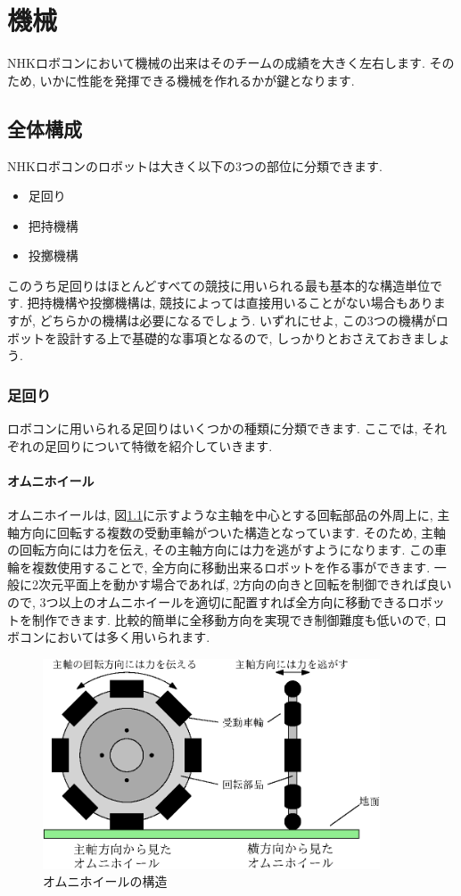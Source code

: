 \chapter{機械}
NHKロボコンにおいて機械の出来はそのチームの成績を大きく左右します. そのため, いかに性能を発揮できる機械を作れるかが鍵となります. 
\section{全体構成}\label{mecha:base}
NHKロボコンのロボットは大きく以下の3つの部位に分類できます.
\begin{itemize}
    \item 足回り
    \item 把持機構
    \item 投擲機構
\end{itemize}
このうち足回りはほとんどすべての競技に用いられる最も基本的な構造単位です. 把持機構や投擲機構は, 競技によっては直接用いることがない場合もありますが, どちらかの機構は必要になるでしょう. いずれにせよ, この3つの機構がロボットを設計する上で基礎的な事項となるので, しっかりとおさえておきましょう. 
\subsection{足回り}
ロボコンに用いられる足回りはいくつかの種類に分類できます. ここでは, それぞれの足回りについて特徴を紹介していきます.

\subsubsection{オムニホイール}
オムニホイールは, 図\ref{fig:omuni_round}に示すような主軸を中心とする回転部品の外周上に, 主軸方向に回転する複数の受動車輪がついた構造となっています. そのため, 主軸の回転方向には力を伝え, その主軸方向には力を逃がすようになります. この車輪を複数使用することで, 全方向に移動出来るロボットを作る事ができます. 一般に2次元平面上を動かす場合であれば, 2方向の向きと回転を制御できれば良いので, 3つ以上のオムニホイールを適切に配置すれば全方向に移動できるロボットを制作できます. 比較的簡単に全移動方向を実現でき制御難度も低いので, ロボコンにおいては多く用いられます. 

\begin{figure}[h]
  \centering
  \includegraphics[width=10cm]{mecha/fig/omuni.eps}
  \caption{オムニホイールの構造}
  \label{fig:omuni_round}
\end{figure}

